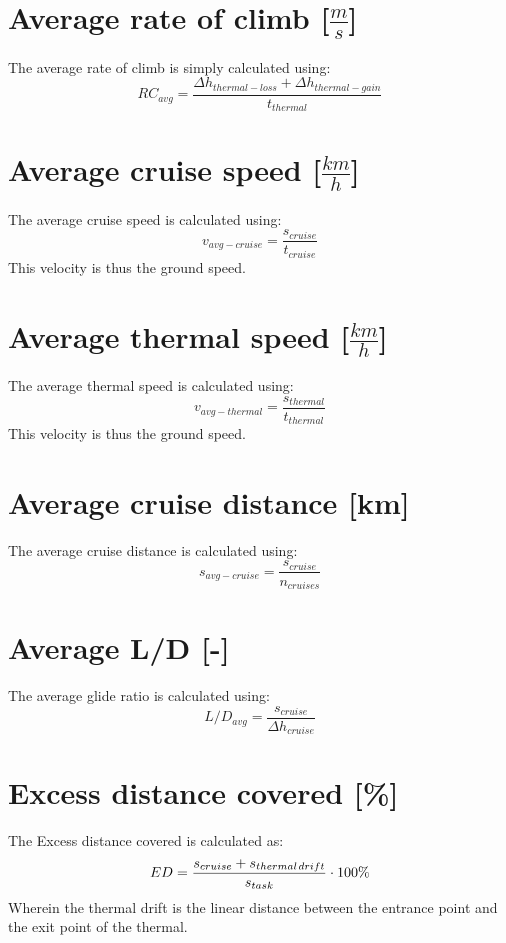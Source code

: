 \section{Average rate of climb [$\frac{m}{s}$]}
The average rate of climb is simply calculated using:
\begin{equation}
R{C_{avg}} = \frac{{\Delta {h_{thermal - loss}} + \Delta {h_{thermal - gain}}}}{{{t_{thermal}}}}
\end{equation}

\section{Average cruise speed [$\frac{km}{h}$]}
The average cruise speed is calculated using:
\begin{equation}
{v_{avg - cruise}} = \frac{{{s_{cruise}}}}{{{t_{cruise}}}}
\end{equation}
This velocity is thus the ground speed.

\section{Average thermal speed [$\frac{km}{h}$]}
The average thermal speed is calculated using:
\begin{equation}
{v_{avg - thermal}} = \frac{{{s_{thermal}}}}{{{t_{thermal}}}}
\end{equation}
This velocity is thus the ground speed.

\section{Average cruise distance [km]}
The average cruise distance is calculated using:
\begin{equation}
{s_{avg - cruise}} = \frac{{{s_{cruise}}}}{{{n_{cruises}}}}
\end{equation}

\section{Average L/D [-]}
The average glide ratio is calculated using:
\begin{equation}
L/{D_{avg}} = \frac{{{s_{cruise}}}}{{\Delta {h_{cruise}}}}
\end{equation}

\section{Excess distance covered [\%]}
The Excess distance covered is calculated as:
\begin{equation}
ED = \frac{{{s_{cruise}} + {s_{thermal{\kern 1pt} drift}}}}{{{s_{task}}}} \cdot 100\% 
\end{equation}
Wherein the thermal drift is the linear distance between the entrance point and the exit point of the thermal.

